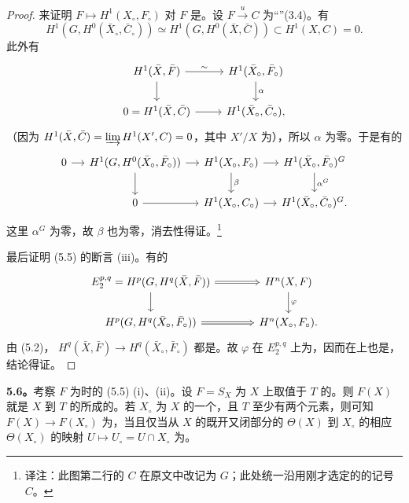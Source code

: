 \begin{proof}
来证明 $F\mapsto H^1(X_\circ,F_\circ)$ 对 $F$ 是。设 $F\xrightarrow{u}C$ 为“”(3.4)。有
\[
H^1(G,H^0(\bar X_\circ,\bar C_\circ))\simeq H^1(G,H^0(\bar X,\bar C))\subset H^1(X,C)=0.
\]
此外有
\[
\begin{tikzcd}
H^1(\bar X,\bar F)\arrow[r,"\sim"]\arrow[d]&H^1(\bar X_\circ,\bar F_\circ)\arrow[d,"\alpha"]\\
0=H^1(\bar X,\bar C)\arrow[r]&H^1(\bar X_\circ,\bar C_\circ),
\end{tikzcd}
\]
（因为 $H^1(\bar X,\bar C)=\varinjlim H^1(X',C)=0$，其中 $X'/X$ 为），所以 $\alpha$ 为零。于是有的
\[
\begin{tikzcd}[column sep=small]
0\arrow[r]&H^1(G,H^0(\bar X_\circ,\bar F_\circ))\arrow[r]\arrow[d]&H^1(X_\circ,F_\circ)\arrow[r]\arrow[d,"\beta"]&H^1(\bar X_\circ,\bar F_\circ)^G\arrow[d,"\alpha^G"]\\
&0\arrow[r]&H^1(X_\circ,C_\circ)\arrow[r]&H^1(\bar X_\circ,\bar C_\circ)^G.
\end{tikzcd}
\]
这里 $\alpha^G$ 为零，故 $\beta$ 也为零，消去性得证。\footnote{译注：此图第二行的 $C$ 在原文中改记为 $G$；此处统一沿用刚才选定的的记号 $C$。}

最后证明 (5.5) 的断言 (iii)。有的
\[
\begin{tikzcd}[column sep=large]
E_2^{p,q}=H^p(G,H^q(\bar X,\bar F))\arrow[r,Rightarrow]\arrow[d]&H^n(X,F)\arrow[d,"\varphi"]\\
H^p(G,H^q(\bar X_\circ,\bar F_\circ))\arrow[r,Rightarrow]&H^n(X_\circ,F_\circ).
\end{tikzcd}
\]
由 (5.2)， $H^q(\bar X,\bar F)\to H^q(\bar X_\circ,\bar F_\circ)$ 都是。故 $\varphi$ 在 $E_2^{p,q}$ 上为，因而在上也是，结论得证。
\end{proof}

\textbf{5.6。}考察 $F$ 为时的 (5.5) (i)、(ii)。设 $F=S_X$ 为 $X$ 上取值于 $T$ 的。则 $F(X)$ 就是 $X$ 到 $T$ 的所成的。若 $X_\circ$ 为 $X$ 的一个，且 $T$ 至少有两个元素，则可知 $F(X)\to F(X_\circ)$ 为，当且仅当从 $X$ 的既开又闭部分的 $\Theta(X)$ 到 $X_\circ$ 的相应 $\Theta(X_\circ)$ 的映射 $U\mapsto U_\circ=U\cap X_\circ$ 为。

